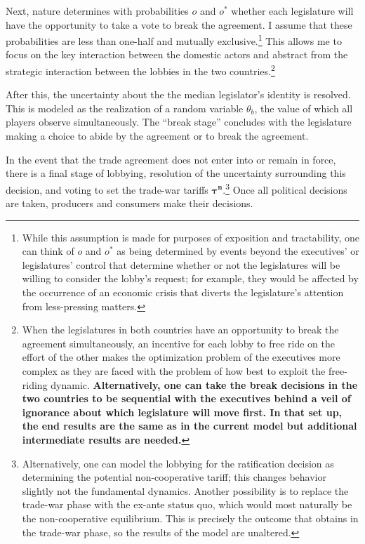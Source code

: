 \documentclass[10pt]{article}
\newcommand{\ta}{\theta}
\newcommand{\btn}{\bm{\tau^n}}
\begin{document}
Next, nature determines with probabilities $o$ and $o^*$ whether each legislature will have the opportunity to take a vote to break the agreement. I assume that these probabilities are less than one-half and mutually exclusive.\footnote{While this assumption is made for purposes of exposition and tractability, one can think of $o$ and $o^*$ as being determined by events beyond the executives' or legislatures' control that determine whether or not the legislatures will be willing to consider the lobby's request; for example, they would be affected by the occurrence of an economic crisis that diverts the legislature's attention from less-pressing matters.} This allows me to focus on the key interaction between the domestic actors and abstract from the strategic interaction between the lobbies in the two countries.\footnote{When the legislatures in both countries have an opportunity to break the agreement simultaneously, an incentive for each lobby to free ride on the effort of the other makes the optimization problem of the executives more complex as they are faced with the problem of how best to exploit the free-riding dynamic. \textbf{Alternatively, one can take the break decisions in the two countries to be sequential with the executives behind a veil of ignorance about which legislature will move first. In that set up, the end results are the same as in the current model but additional intermediate results are needed.}}

After this, the uncertainty about the the median legislator's identity is resolved. This is modeled as the realization of a random variable $\ta_b$, the value of which all players observe simultaneously. The ``break stage'' concludes with the legislature making a choice to abide by the agreement or to break the agreement.

In the event that the trade agreement does not enter into or remain in force, there is a final stage of lobbying, resolution of the uncertainty surrounding this decision, and voting to set the trade-war tariffs $\btn$.\footnote{Alternatively, one can model the lobbying for the ratification decision as determining the potential non-cooperative tariff; this changes behavior slightly not the fundamental dynamics. Another possibility is to replace the trade-war phase with the ex-ante status quo, which would most naturally be the non-cooperative equilibrium. This is precisely the outcome that obtains in the trade-war phase, so the results of the model are unaltered.} Once all political decisions are taken, producers and consumers make their decisions.
\end{document}
